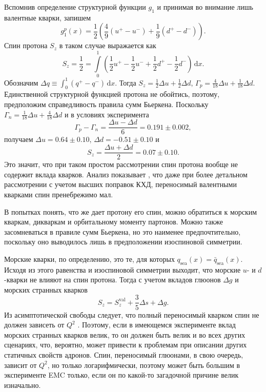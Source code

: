 \documentclass[
	a4paper, 10pt,
	twocolumn
]{article}
\def\d{\,\mathrm{d}}
\begin{document}
Вспомнив определение структурной функции $g_1$ и принимая во внимание лишь валентные кварки, запишем 
$$ 
g^p_1(x) = \frac{1}{2}\left(
	\frac{4}{9}\left(u^+-u^-\right) + 
	\frac{1}{9}\left(d^+-d^-\right)
\right).
$$
Спин протона $S_z$ в таком случае выражается как
$$
S_z = \frac{1}{2} = 
\int\limits_0^1 \left(
	\frac{1}{2}u^+ - \frac{1}{2}u^- +
	\frac{1}{2}d^+ - \frac{1}{2}d^-
\right)\!\!\d x.
$$
Обозначим $\Delta q \equiv \int_0^1(q^+-q^-)\d x$. Тогда $S_z = \frac{1}{2}\Delta u + \frac{1}{2}\Delta d$, $\Gamma_p = \frac{4}{18}\Delta u + \frac{1}{18}\Delta d$. Единственной структурной функцией протона не обойтись, поэтому, предположим справедливость правила сумм Бьеркена. Поскольку $\Gamma_n = \frac{1}{18}\Delta u + \frac{4}{18}\Delta d$ и в условиях эксперимента
\begin{equation*}
\Gamma_p - \Gamma_n = \frac{\Delta u - \Delta d}{6} = 0.191 \pm 0.002,
\end{equation*}
получаем $\Delta u = 0.64\pm0.10$, $\Delta d = -0.51\pm0.10$ и 
$$
S_z = \frac{\Delta u + \Delta d}{2} = 0.07 \pm 0.10.
$$
Это значит, что при таком простом рассмотрении спин протона вообще не содержит вклада кварков. 
Анализ показывает \cite{EMC.theory.fix}, что даже при более детальном рассмотрении с учетом высших поправок КХД, переносимый валентными кварками спин пренебрежимо мал. 

В попытках понять, что же дает протону его спин, можно обратиться к морским кваркам, дикваркам и орбитальному моменту партонов. Можно также засомневаться в правиле сумм Бьеркена, но это наименее предпочтительно, поскольку оно выводилось лишь в предположении изоспиновой симметрии. 

Морские кварки, по определению, это те, для которых $ q_\mathrm{sea}(x) = \bar{q}_\mathrm{sea}(x) $. Исходя из этого равенства и изоспиновой симметрии выходит, что морские $u$- и $d$-кварки не влияют на спин протона. Тогда с учетом вкладов глюонов $\Delta g$ и морских странных кварков
\begin{equation*}
S_z = S_z^\mathrm{val} + \frac{3}{5}\Delta s + \Delta g.
\end{equation*}
Из асимптотической свободы следует, что полный переносимый кварком спин не должен зависеть от $Q^2$ \cite{AltarelliParisi}. Поэтому, если в имеющемся эксперименте вклад морских странных кварков велик, то он должен быть велик и во всех других сценариях, что, вероятно, может привести к проблемам при описании других статичных свойств адронов. 
Спин, переносимый глюонами, в свою очередь, зависит от $Q^2$, но только логарифмически, поэтому может быть большим в эксперименте EMC только, если он по какой-то загадочной причине велик изначально.
\end{document}
